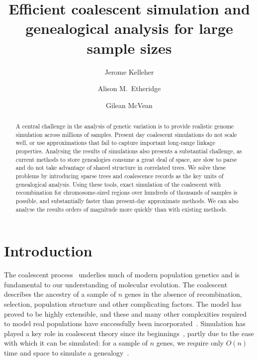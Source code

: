 \documentclass[10pt]{article}
\begin{document}
\title{Efficient coalescent simulation and genealogical
    analysis for large sample sizes}
\author{Jerome Kelleher \and Alison M.\ Etheridge \and Gilean McVean}
\maketitle

\begin{abstract}
A central challenge in the analysis of genetic variation is to
provide realistic genome simulation across millions of samples. Present day
coalescent simulations do not scale well, or use approximations that fail to
capture important long-range linkage properties. Analysing the results of
simulations also presents a substantial challenge, as current methods to store
genealogies consume a great deal of space, are slow to parse and do not
take advantage of shared structure in correlated trees. We solve these problems
by introducing sparse trees and coalescence records as the key units of
genealogical analysis. Using these tools, exact simulation of the coalescent
with recombination for chromosome-sized regions over hundreds of thousands of
samples is possible, and substantially faster than present-day approximate
methods. We can also analyse the results orders of magnitude more quickly than
with existing methods.
\end{abstract}


\section{Introduction}
\label{sec-introduction}

The coalescent process~\citep{k82,h83a} underlies much of modern population
genetics and is fundamental to our understanding of molecular evolution. The
coalescent describes the ancestry of a sample of $n$ genes in the absence of
recombination, selection, population structure and other complicating factors.
The model has proved to be highly extensible, and these and many other
complexities required to model real populations have successfully been
incorporated~\citep{w08}. Simulation has played a key role in coalescent theory
since its beginnings~\citep{h83a}, partly due to the ease with which it can be
simulated: for a sample of $n$ genes, we require only $O(n)$ time and space to
simulate a genealogy~\citep{h90}.
\end{document}
